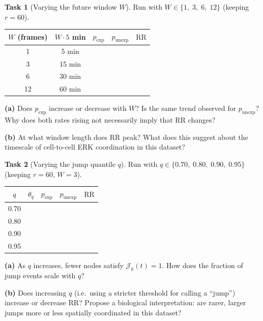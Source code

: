 \documentclass[11pt,a4paper]{article}
\theoremstyle{definition}
\newtheorem{task}{Task}
\newcommand{\JE}[2]{\mathcal{J}_{#1}(#2)}
\newcommand{\RR}{\mathrm{RR}}
\newcommand{\pE}{p_{\mathrm{exp}}}
\newcommand{\pU}{p_{\mathrm{unexp}}}
\newcommand{\1}[1]{\mathbf{1}\!\left[#1\right]}
\newcommand{\Thr}{\theta}
\begin{document}
\begin{task}[Varying the future window $W$]\label{task:window}
Run with $W \in \{1,\; 3,\; 6,\; 12\}$ (keeping $r=60$).

\begin{center}
\renewcommand{\arraystretch}{1.4}
\begin{tabular}{ccccc}
\toprule
$W$ (frames) & $W \cdot 5$ min & $\pE$ & $\pU$ & $\RR$ \\
\midrule
1  & 5 min  & & & \\
3  & 15 min & & & \\
6  & 30 min & & & \\
12 & 60 min & & & \\
\bottomrule
\end{tabular}
\end{center}

\medskip
\noindent\textbf{(a)} Does $\pE$ increase or decrease with $W$?
Is the same trend observed for $\pU$?
Why does both rates rising not necessarily imply that $\RR$ changes?



\noindent\textbf{(b)} At what window length does $\RR$ peak?
What does this suggest about the timescale of cell-to-cell ERK coordination
in this dataset?


\end{task}

\begin{task}[Varying the jump quantile $q$]\label{task:quantile}
Run with $q \in \{0.70,\; 0.80,\; 0.90,\; 0.95\}$ (keeping $r=60$, $W=3$).

\begin{center}
\renewcommand{\arraystretch}{1.4}
\begin{tabular}{ccccc}
\toprule
$q$ & $\Thr_q$ & $\pE$ & $\pU$ & $\RR$ \\
\midrule
0.70 & & & & \\
0.80 & & & & \\
0.90 & & & & \\
0.95 & & & & \\
\bottomrule
\end{tabular}
\end{center}

\medskip
\noindent\textbf{(a)} As $q$ increases, fewer nodes satisfy $\JE{k}{t}=1$.
How does the fraction of jump events scale with $q$?



\noindent\textbf{(b)} Does increasing $q$ (i.e.\ using a stricter threshold
for calling a ``jump'') increase or decrease $\RR$?
Propose a biological interpretation: are rarer, larger jumps more or less
spatially coordinated in this dataset?


\end{task}
\end{document}
